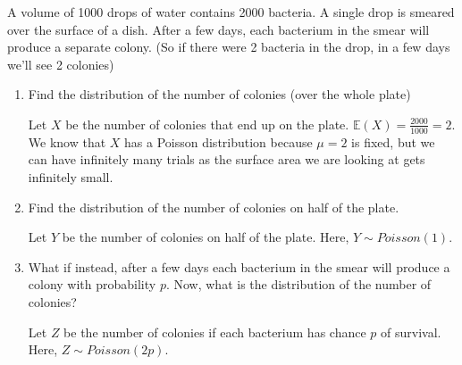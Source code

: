 \documentclass[titlepage, 12pt, leqno]{article}
\begin{document}
\begin{ex}
    A volume of 1000 drops of water contains 2000 bacteria. A single drop is 
    smeared over the surface of a dish. After a few days, each bacterium in the
    smear will produce a separate colony. (So if there were 2 bacteria in the
    drop, in a few days we'll see 2 colonies)
    \vspace{10px}
    

    \begin{enumerate}
        \item Find the distribution of the number of colonies (over the whole
            plate)
            \vspace{10px}
            
            Let $X$ be the number of colonies that end up on the plate. 
            $ \mathbb{E}(X) = \frac{2000}{1000} = 2$. We know that $X$ has a 
            Poisson distribution because $\mu=2$ is fixed, but we can have 
            infinitely many trials as the surface area we are looking at gets 
            infinitely small.
            \vspace{10px}
            
        \item Find the distribution of the number of colonies on half of the
            plate.
            \vspace{10px}
            
            Let $Y$ be the number of colonies on half of the plate. Here,
            $Y \sim Poisson(1)$.
            \vspace{10px}
            
        \item What if instead, after a few days each bacterium in the smear will
            produce a colony with probability $p$. Now, what is the distribution
            of the number of colonies?
            \vspace{10px}
            
            Let $Z$ be the number of colonies if each bacterium has chance $p$ of
            survival. Here, $Z \sim Poisson(2p)$.
    \end{enumerate}
\end{ex}
\end{document}

